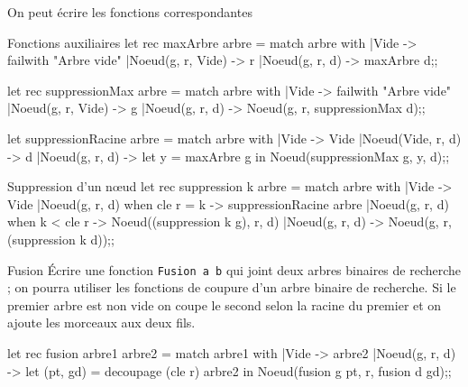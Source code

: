 On peut écrire les fonctions correspondantes
\begin{code}{Fonctions auxiliaires}
let rec maxArbre arbre = 
  match arbre with
  |Vide -> failwith "Arbre vide"
  |Noeud(g, r, Vide) -> r
  |Noeud(g, r, d) -> maxArbre d;;

let rec suppressionMax arbre = 
  match arbre with
  |Vide -> failwith "Arbre vide"
  |Noeud(g, r, Vide) -> g
  |Noeud(g, r, d) -> Noeud(g, r, suppressionMax d);;

let suppressionRacine arbre = 
  match arbre with
  |Vide -> Vide
  |Noeud(Vide, r, d) -> d
  |Noeud(g, r, d) ->  let y = maxArbre g in
                      Noeud(suppressionMax g, y, d);;
\end{code}
\begin{code}{Suppression d'un nœud}
let rec suppression k arbre = 
  match arbre with
  |Vide -> Vide
  |Noeud(g, r, d) when cle r = k 
                  -> suppressionRacine arbre
  |Noeud(g, r, d) when k < cle r 
                  -> Noeud((suppression k g), r, d)
  |Noeud(g, r, d) -> Noeud(g, r, (suppression k d));;
\end{code}
\begin{exo}{Fusion}{}
Écrire une fonction {\tt Fusion a b} qui joint deux 
arbres binaires de recherche ; on pourra utiliser les fonctions de coupure d'un arbre binaire de recherche.
\reponse
Si le premier arbre est non vide on coupe le second selon la racine du premier et on ajoute les morceaux aux deux fils.
\begin{ocaml}
let rec fusion arbre1 arbre2 =
  match arbre1 with
  |Vide -> arbre2
  |Noeud(g, r, d) -> let (pt, gd) = decoupage (cle r) arbre2 in
                      Noeud(fusion g pt, r, fusion d gd);;
\end{ocaml}
\end{exo}

